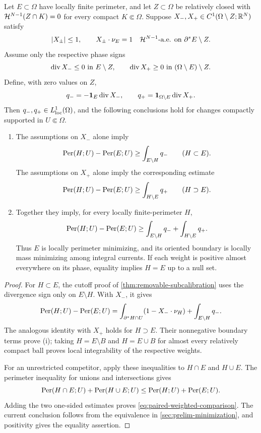 \begin{theorem}
\label{thm:paired-subcalibration}
Let \(E\subset\Omega\) have locally finite perimeter, and let
\(Z\subset\Omega\) be relatively closed with
\(\mathcal H^{N-1}(Z\cap K)=0\) for every compact \(K\Subset\Omega\).
Suppose \(X_-,X_+\in C^1(\Omega\setminus Z;\mathbb R^N)\) satisfy
\[
 |X_\pm|\leq1,\qquad X_\pm\cdot\nu_E=1
 \quad\mathcal H^{N-1}\text{-a.e. on }\partial^*E\setminus Z.
\]
Assume only the respective phase signs
\[
 \operatorname{div} X_-\leq0\text{ in }E\setminus Z,\qquad
 \operatorname{div} X_+\geq0\text{ in }(\Omega\setminus E)\setminus Z.
\]
Define, with zero values on \(Z\),
\[
 q_-=-\mathbf 1_E\operatorname{div} X_-,\qquad
 q_+=\mathbf 1_{\Omega\setminus E}\operatorname{div} X_+.
\]
Then \(q_-,q_+\in L^1_{\rm loc}(\Omega)\), and the following
conclusions hold for changes compactly supported in \(U\Subset\Omega\).
\begin{enumerate}[label=\textup{(\roman*)}]
 \item The assumptions on \(X_-\) alone imply
 \[
  \operatorname{Per}(H;U)-\operatorname{Per}(E;U)\geq\int_{E\setminus H}q_-
  \qquad(H\subset E).
 \]
 The assumptions on \(X_+\) alone imply the corresponding estimate
 \[
  \operatorname{Per}(H;U)-\operatorname{Per}(E;U)\geq\int_{H\setminus E}q_+
  \qquad(H\supset E).
 \]
 \item Together they imply, for every locally finite-perimeter \(H\),
 \begin{equation}\label{eq:paired-weighted-comparison}
  \operatorname{Per}(H;U)-\operatorname{Per}(E;U)
  \geq\int_{E\setminus H}q_-+\int_{H\setminus E}q_+.
 \end{equation}
 Thus \(E\) is locally perimeter minimizing, and its oriented boundary
 is locally mass minimizing among integral currents.  If each weight
 is positive almost everywhere on its phase, equality implies
 \(H=E\) up to a null set.
\end{enumerate}
\end{theorem}

\begin{proof}
For \(H\subset E\), the cutoff proof of
\cref{thm:removable-subcalibration} uses the divergence sign only on
\(E\setminus H\). With \(X_-\), it gives
\[
 \operatorname{Per}(H;U)-\operatorname{Per}(E;U)
 =\int_{\partial^*H\cap U}(1-X_-\cdot\nu_H)
  +\int_{E\setminus H}q_-.
\]
The analogous identity with \(X_+\) holds for \(H\supset E\).
Their nonnegative boundary terms prove \textup{(i)}; taking
\(H=E\setminus B\) and \(H=E\cup B\) for almost every relatively
compact ball proves local integrability of the respective weights.

For an unrestricted competitor, apply these inequalities to
\(H\cap E\) and \(H\cup E\).  The perimeter inequality for
unions and intersections \cite{Maggi12} gives
\[
 \operatorname{Per}(H\cap E;U)+\operatorname{Per}(H\cup E;U)
 \leq\operatorname{Per}(H;U)+\operatorname{Per}(E;U).
\]
Adding the two one-sided estimates proves
\eqref{eq:paired-weighted-comparison}.  The current conclusion follows
from the equivalence in \cref{sec:prelim-minimization}, and positivity
gives the equality assertion.
\end{proof}


